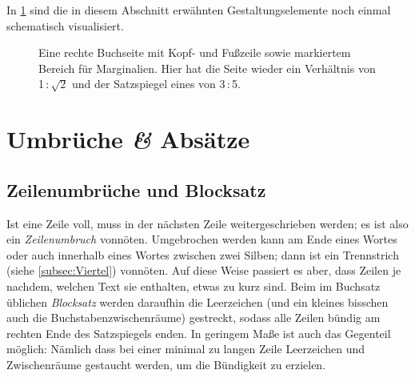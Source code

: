In \cref{fig:Stege} sind die in diesem Abschnitt erwähnten Gestaltungselemente
noch einmal schematisch visualisiert.

\begin{figure}
  \centering
  \caption{Eine rechte Buchseite mit Kopf- und Fußzeile sowie markiertem Bereich
    für Marginalien. Hier hat die Seite wieder ein Verhältnis von
    1\,:\,$\sqrt{\text{2}}$ und der Satzspiegel eines von 3\,:\,5.}
  \label{fig:Stege}
\end{figure}

\section{Umbrüche \emph{\&} Absätze}

\subsection{Zeilenumbrüche und Blocksatz}

Ist eine Zeile voll, muss in der nächsten Zeile weitergeschrieben werden; es ist
also ein \emph{Zeilenumbruch} vonnöten. Umgebrochen werden kann am Ende eines
Wortes oder auch innerhalb eines Wortes zwischen zwei Silben; dann ist ein
Trennstrich (siehe \cref{subsec:Viertel}) vonnöten. Auf diese Weise passiert es
aber, dass Zeilen je nachdem, welchen Text sie enthalten, etwas zu kurz
sind. Beim im Buchsatz üblichen \emph{Blocksatz} werden daraufhin die
Leerzeichen (und ein kleines bisschen auch die Buchstabenzwischenräume)
gestreckt, sodass alle Zeilen bündig am rechten Ende des Satzspiegels enden. In
geringem Maße ist auch das Gegenteil möglich: Nämlich dass bei einer minimal zu
langen Zeile Leerzeichen und Zwischenräume gestaucht werden, um die Bündigkeit
zu erzielen.

